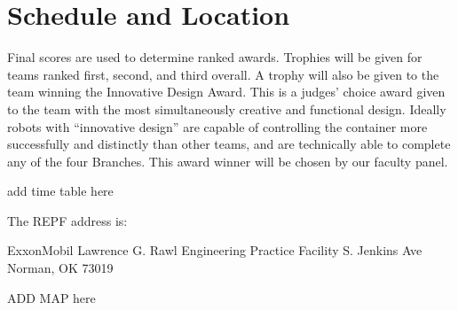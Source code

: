 \section{Schedule and Location}
Final scores are used to determine ranked awards. Trophies will be given for teams ranked first, second, and third overall. A trophy will also be given to the team winning the Innovative Design Award. This is a judges’ choice award given to the team with the most simultaneously creative and functional design. Ideally robots with “innovative design” are capable of controlling the container more successfully and distinctly than other teams, and are technically able to complete any of the four Branches. This award winner will be chosen by our faculty panel. \newline

\noindent
add time table here \newline

\noindent
The REPF address is: \newline 

\centering ExxonMobil Lawrence G. Rawl Engineering Practice Facility
 S. Jenkins Ave
\centering Norman, OK 73019 

ADD MAP here
